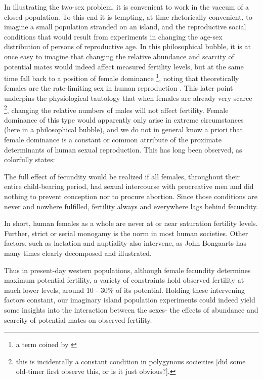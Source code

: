 
In illustrating the two-sex problem, it is convenient to work in the vaccum of a 
closed population. To this end it is tempting, at time rhetorically convenient,
to imagine a small population stranded on an island, and the reproductive social
conditions that would result from experiments in changing the age-sex
distribution of persons of reproductive age. In this philosophical bubble, it is
at once easy to imagine that changing the relative abundance and scarcity of
potential mates would indeed affect measured fertility levels, but at the same
time fall back to a position of female dominance \footnote{a term coined by
\citet{goodman1953population}}, noting that theoretically females are the
rate-limiting sex in human reproduction \citep{wood1994dynamics, }. This later
point underpins the physiological tautology that when females are already very scarce
\footnote{this is incidentally a constant condition in polygynous socieities
[did some old-timer first observe this, or is it just obvious?].}, changing the
relative numbers of males will not affect fertility. Female dominance of this
type would apparently only arise in extreme circumstances (here in a
philosophical bubble), and we do not in general know a priori that female
dominance is a constant or common atrribute of the proximate determinants of human sexual
reproduction. This has long been observed, as
\citet[p. 1]{kuczynski1935measurement} colorfully states:
\begin{citation}
The full effect of fecundity would be realized if all females, throughout their
entire child-bearing period, had sexual intercourse with procreative men and did
nothing to prevent conception nor to procure abortion. Since those conditions
are never and nowhere fulfilled, fertility always and everywhere lags behind
fecundity.
\end{citation}

In short, human females as a whole are never at or near saturation fertility
levels. Further, strict or serial monogamy is the norm in most human societies.
Other factors, such as lactation and nuptiality also intervene, as John
Bongaarts \citep{bongaarts1978framework, bongaarts1982fertility, bongaarts1983fertility} 
has many times clearly decomposed and illustrated. 

Thus in present-day western populations, although female fecundity determines
maximum potential fertility, a variety of constraints hold observed fertility at
much lower levels, around 10 - 30\% of its potential. Holding these intervening
factors constant, our imaginary island population experiments could indeed yield
some insights into the interaction between the sexes- the effects of abundance and scarcity of
potential mates on observed fertility. 

